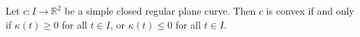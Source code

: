 Let $c: I \to \mathbb{R}^2$ be a simple closed regular plane curve. Then $c$ is convex if and only if $\kappa(t) \geq 0$ for all $t \in I$, or $\kappa(t) \leq 0$ for all $t \in I$.